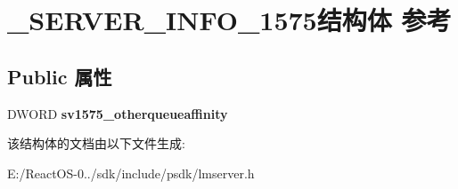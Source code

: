 \hypertarget{struct___s_e_r_v_e_r___i_n_f_o__1575}{}\section{\+\_\+\+S\+E\+R\+V\+E\+R\+\_\+\+I\+N\+F\+O\+\_\+1575结构体 参考}
\label{struct___s_e_r_v_e_r___i_n_f_o__1575}
\subsection*{Public 属性}
\begin{DoxyCompactItemize}
\item 
\mbox{\label{struct___s_e_r_v_e_r___i_n_f_o__1575_a71d2347c63d45c3aa331d9544d72a5f9}} 
D\+W\+O\+RD {\bfseries sv1575\+\_\+otherqueueaffinity}
\end{DoxyCompactItemize}


该结构体的文档由以下文件生成\+:\begin{DoxyCompactItemize}
\item 
E\+:/\+React\+O\+S-\/0../sdk/include/psdk/lmserver.\+h\end{DoxyCompactItemize}
